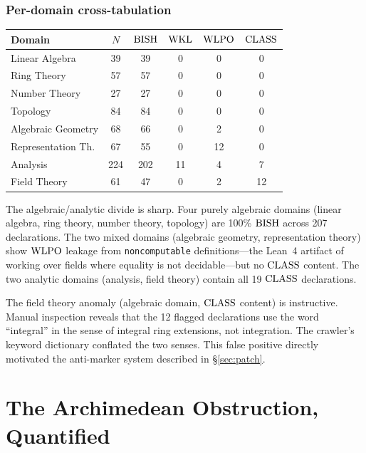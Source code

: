 \documentclass[11pt,a4paper]{article}
\theoremstyle{plain}
\theoremstyle{definition}
\newcommand{\BISH}{\textup{BISH}}
\newcommand{\WKL}{\textup{WKL}}
\newcommand{\WLPO}{\textup{WLPO}}
\newcommand{\CLASS}{\textup{CLASS}}
\begin{document}
\section{Per-domain cross-tabulation}\label{sec:per-domain}

\begin{center}
\small
\begin{tabular}{lccccc}
\toprule
\textbf{Domain} & \textbf{$N$} & \textbf{$\BISH$} & \textbf{$\WKL$}
  & \textbf{$\WLPO$} & \textbf{$\CLASS$} \\
\midrule
Linear Algebra     & 39  & 39  &  0 &  0 &  0 \\
Ring Theory        & 57  & 57  &  0 &  0 &  0 \\
Number Theory      & 27  & 27  &  0 &  0 &  0 \\
Topology           & 84  & 84  &  0 &  0 &  0 \\
Algebraic Geometry & 68  & 66  &  0 &  2 &  0 \\
Representation Th. & 67  & 55  &  0 & 12 &  0 \\
Analysis           & 224 & 202 & 11 &  4 &  7 \\
Field Theory       & 61  & 47  &  0 &  2 & 12 \\
\bottomrule
\end{tabular}
\end{center}

The algebraic/analytic divide is sharp.  Four purely algebraic domains
(linear algebra, ring theory, number theory, topology) are 100\%
$\BISH$ across 207 declarations.  The two mixed domains (algebraic
geometry, representation theory) show $\WLPO$ leakage from
\texttt{noncomputable} definitions---the Lean~4 artifact of working
over fields where equality is not decidable---but no $\CLASS$ content.
The two analytic domains (analysis, field theory) contain all 19
$\CLASS$ declarations.

The field theory anomaly (algebraic domain, $\CLASS$ content) is
instructive.  Manual inspection reveals that the 12 flagged
declarations use the word ``integral'' in the sense of integral ring
extensions, not integration.  The crawler's keyword dictionary
conflated the two senses.  This false positive directly motivated the
anti-marker system described in \S\ref{sec:patch}.


\part{The Archimedean Obstruction, Quantified}\label{part:archimedean}
\end{document}
